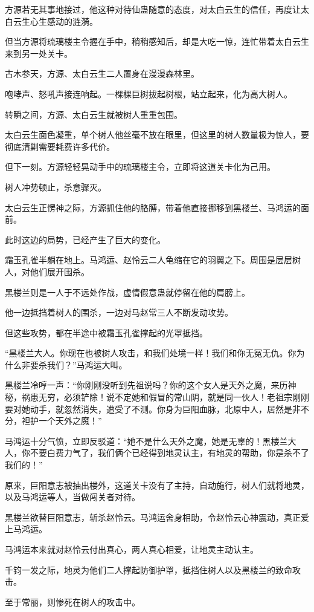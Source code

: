\begin{this_body}
方源若无其事地接过，他这种对待仙蛊随意的态度，对太白云生的信任，再度让太白云生心生感动的涟漪。

但当方源将琉璃楼主令握在手中，稍稍感知后，却是大吃一惊，连忙带着太白云生来到另一处关卡。

古木参天，方源、太白云生二人置身在漫漫森林里。

咆哮声、怒吼声接连响起。一棵棵巨树拔起树根，站立起来，化为高大树人。

转瞬之间，方源、太白云生就被树人重重包围。

太白云生面色凝重，单个树人他丝毫不放在眼里，但这里的树人数量极为惊人，要彻底清剿需要耗费许多代价。

但下一刻。方源轻轻晃动手中的琉璃楼主令，立即将这道关卡化为己用。

树人冲势顿止，杀意骤灭。

太白云生正愣神之际，方源抓住他的胳膊，带着他直接挪移到黑楼兰、马鸿运的面前。

此时这边的局势，已经产生了巨大的变化。

霜玉孔雀半躺在地上。马鸿运、赵怜云二人龟缩在它的羽翼之下。周围是层层树人，对他们展开围杀。

黑楼兰则是一人于不远处作战，虚情假意蛊就停留在他的肩膀上。

他一边抵挡着树人的围杀，一边对马赵常三人不断发动攻势。

但这些攻势，都在半途中被霜玉孔雀撑起的光罩抵挡。

“黑楼兰大人。你现在也被树人攻击，和我们处境一样！我们和你无冤无仇。你为什么非要杀我们？”马鸿运大叫。

黑楼兰冷哼一声：“你刚刚没听到先祖说吗？你的这个女人是天外之魔，来历神秘，祸患无穷，必须铲除！说不定她和假冒的常山阴，就是同一伙人！老祖宗刚刚要对她动手，就忽然消失，遭受了不测。你身为巨阳血脉，北原中人，居然是非不分，袒护一个天外之魔！”

马鸿运十分气愤，立即反驳道：“她不是什么天外之魔，她是无辜的！黑楼兰大人，你不要白费力气了，我们俩个已经得到地灵认主，有地灵的帮助，你是杀不了我们的！”

原来，巨阳意志被抽出楼外，这道关卡没有了主持，自动施行，树人们就将地灵，以及马鸿运等人，当做闯关者对待。

黑楼兰欲替巨阳意志，斩杀赵怜云。马鸿运舍身相助，令赵怜云心神震动，真正爱上马鸿运。

马鸿运本来就对赵怜云付出真心，两人真心相爱，让地灵主动认主。

千钧一发之际，地灵为他们二人撑起防御护罩，抵挡住树人以及黑楼兰的致命攻击。

至于常丽，则惨死在树人的攻击中。


\end{this_body}
